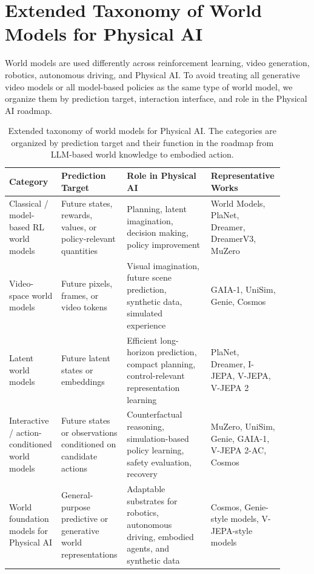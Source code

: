 \section{Extended Taxonomy of World Models for Physical AI}
\label{app:world-models}

World models are used differently across reinforcement learning, video generation, robotics, autonomous driving, and Physical AI. 
To avoid treating all generative video models or all model-based policies as the same type of world model, we organize them by prediction target, interaction interface, and role in the Physical AI roadmap.

\begin{table}[t]
\centering
\small
\begin{tabular}{p{0.16\linewidth}p{0.22\linewidth}p{0.30\linewidth}p{0.22\linewidth}}
\toprule
Category & Prediction Target & Role in Physical AI & Representative Works \\
\midrule
Classical / model-based RL world models 
& Future states, rewards, values, or policy-relevant quantities 
& Planning, latent imagination, decision making, policy improvement 
& World Models, PlaNet, Dreamer, DreamerV3, MuZero \\
\midrule
Video-space world models 
& Future pixels, frames, or video tokens 
& Visual imagination, future scene prediction, synthetic data, simulated experience 
& GAIA-1, UniSim, Genie, Cosmos \\
\midrule
Latent world models 
& Future latent states or embeddings 
& Efficient long-horizon prediction, compact planning, control-relevant representation learning 
& PlaNet, Dreamer, I-JEPA, V-JEPA, V-JEPA 2 \\
\midrule
Interactive / action-conditioned world models 
& Future states or observations conditioned on candidate actions 
& Counterfactual reasoning, simulation-based policy learning, safety evaluation, recovery 
& MuZero, UniSim, Genie, GAIA-1, V-JEPA 2-AC, Cosmos \\
\midrule
World foundation models for Physical AI 
& General-purpose predictive or generative world representations 
& Adaptable substrates for robotics, autonomous driving, embodied agents, and synthetic data 
& Cosmos, Genie-style models, V-JEPA-style models \\
\bottomrule
\end{tabular}
\caption{Extended taxonomy of world models for Physical AI. The categories are organized by prediction target and their function in the roadmap from LLM-based world knowledge to embodied action.}
\label{tab:world-model-taxonomy}
\end{table}

